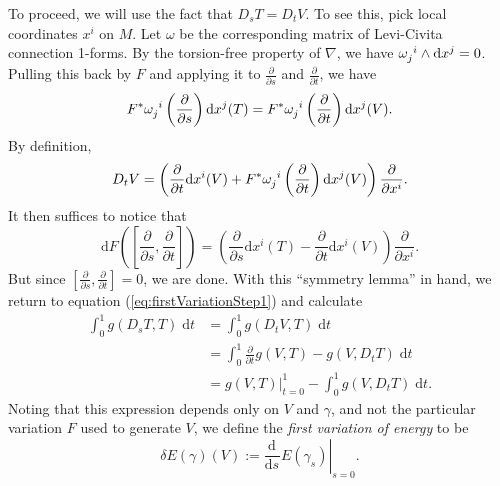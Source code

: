 \documentclass{book}
\renewcommand{\d}{\mathrm{d}}
\newcommand{\parens}[1]{\left( {#1} \right)}
\newcommand{\pdv}[2]{\frac{\partial{#1}}{\partial{#2}}}
\newcommand{\odv}[3][]{\frac{\d^{#1}#2}{\d{#3}^{#1}}}
\theoremstyle{definition}
\numberwithin{equation}{section}
\begin{document}
To proceed, we will use the fact that $D_s T = D_t V$. To see this, pick local coordinates $x^i$ on $M$. Let $\omega$ be the corresponding matrix of Levi-Civita connection 1-forms. By the torsion-free property of $\nabla$, we have $\tensor{\omega}{_j^i} \wedge \d{x}^j = 0$. Pulling this back by $F$ and applying it to $\pdv{}{s}$ and $\pdv{}{t}$, we have
\begin{equation}
    F^*\tensor{\omega}{_j^i}\parens{\pdv{}{s}} \d{x^j}(T) = F^*\tensor{\omega}{_j^i}\parens{\pdv{}{t}} \d{x^j}(V).
\end{equation}
By definition,
\begin{equation}
    D_t V = \parens{ \pdv{}{t} \d{x^i}(V) + F^*\tensor{\omega}{_j^i}\parens{\pdv{}{t}} \d{x^j}(V) } \pdv{}{x^i}.
\end{equation}
It then suffices to notice that 
\begin{equation}
    \d{F}\parens{\left[ \pdv{}{s},\pdv{}{t} \right]} = \parens{\pdv{}{s}\d{x^i}(T) - \pdv{}{t}\d{x^i}(V)} \pdv{}{x^i}. 
\end{equation}    
But since $[ \pdv{}{s},\pdv{}{t} ] = 0$, we are done. With this ``symmetry lemma'' in hand, we return to equation (\ref{eq:firstVariationStep1}) and calculate 
\begin{equation} \begin{aligned}
    \int_0^1 g(D_s T,T) \; \d{t} &= \int_0^1 g(D_t V,T) \; \d{t} \\
                                 &= \int_0^1 \pdv{}{t} g(V,T) - g(V,D_t T) \; \d{t} \\
                                 &= g(V,T) \vert_{t=0}^1 - \int_0^1 g(V,D_t T) \; \d{t}.
\end{aligned} \end{equation}
Noting that this expression depends only on $V$ and $\gamma$, and not the particular variation $F$ used to generate $V$, we define the \textit{first variation of energy} to be 
\begin{equation}
    \delta E(\gamma)(V) := \left. \odv{}{s} E(\gamma_s) \right\vert_{s = 0}.
\end{equation}
\end{document}
